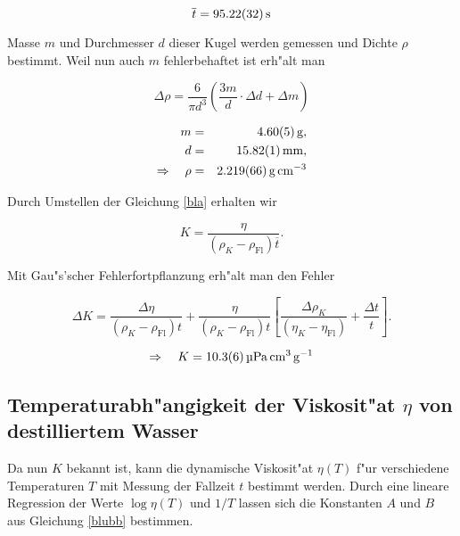 		\begin{equation*}
			\overline{t} = \SI{95.22 (32)}{\second}
		\end{equation*}

		Masse $m$ und Durchmesser $d$ dieser Kugel werden gemessen und Dichte $\rho$ bestimmt.
		Weil nun auch $m$ fehlerbehaftet ist erh"alt man

		\begin{equation*}
			\Delta \rho = \frac{6}{\pi d^3} \left( \frac{3 m}{d} \cdot \Delta d + \Delta m \right)
		\end{equation*}

		\begin{eqnarray*}
				m & = & \SI{4.60 (5)}{\gram} , \\
				d & = & \SI{15.82 (1)}{\milli \meter} , \\
				\Rightarrow \quad \rho & = & \SI{2.219 (66)}{\gram \per \centi \meter \cubed}
		\end{eqnarray*}

		Durch Umstellen der Gleichung \eqref{bla} erhalten wir

		\begin{equation}
			K = \frac{\eta}{\left(\rho_K - \rho_\mathrm{Fl}\right) \overline{t}} .
		\end{equation}

		Mit Gau"s'scher Fehlerfortpflanzung erh"alt man den Fehler

		\begin{equation*}
			\Delta K = \frac{\Delta \eta}{\left(\rho_K - \rho_\mathrm{Fl}\right) t} + \frac{\eta}{\left(\rho_K - \rho_\mathrm{Fl}\right) t} \left[ \frac{\Delta \rho_K}{\left( \eta_K - \eta_\mathrm{Fl} \right)} + \frac{\Delta t}{t} \right] .
		\end{equation*}

		\begin{equation*}
			\Rightarrow \quad K = \SI{10.3 (6)}{\micro \pascal \centi \meter \cubed \per \gram}
		\end{equation*}

	\subsection{Temperaturabh"angigkeit der Viskosit"at $\eta$ von destilliertem Wasser}
		\label{sub:temperaturabhaengigkeit}

		Da nun $K$ bekannt ist, kann die dynamische Viskosit"at $\eta (T)$ f"ur verschiedene Tem\-pe\-ra\-tu\-ren $T$ mit Messung der Fallzeit $t$ bestimmt werden.
		Durch eine lineare Regression der Werte $\log{\eta (T)}$ und $1 / T$ lassen sich die Konstanten $A$ und $B$ aus Gleichung \eqref{blubb} bestimmen.


